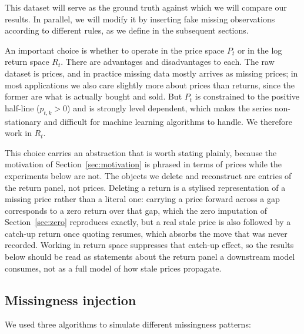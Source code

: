 This dataset will serve as the ground truth against which we will compare our results.
In parallel, we will modify it by inserting fake missing observations according to different
rules, as we define in the subsequent sections.

An important choice is whether to operate in the price space $P_t$ or in the log
return space $R_t$. There are advantages and disadvantages to each. The raw
dataset is prices, and in practice missing data mostly arrives as missing
prices; in most applications we also care slightly more about prices than
returns, since the former are what is actually bought and sold. But $P_t$ is
constrained to the positive half-line ($p_{t,k} > 0$) and is strongly level
dependent, which makes the series non-stationary and difficult for machine
learning algorithms to handle. We therefore work in $R_t$.

This choice carries an abstraction that is worth stating plainly, because the
motivation of Section~\ref{sec:motivation} is phrased in terms of prices while
the experiments below are not. The objects we delete and reconstruct are
entries of the return panel, not prices. Deleting a return is a stylised
representation of a missing price rather than a literal one: carrying a price
forward across a gap corresponds to a zero return over that gap, which the zero
imputation of Section~\ref{sec:zero} reproduces exactly, but a real stale price
is also followed by a catch-up return once quoting resumes, which absorbs the
move that was never recorded. Working in return space suppresses that catch-up
effect, so the results below should be read as statements about the return
panel a downstream model consumes, not as a full model of how stale prices
propagate.

\subsection{Missingness injection}
\label{sec:missingness}

We used three algorithms to simulate different missingness patterns:

